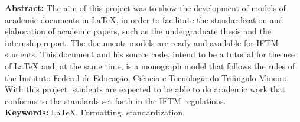 \begin{singlespace}
\textbf{Abstract: }
The aim of this project was to show the development of models of academic documents in LaTeX, in order to facilitate the standardization and elaboration of academic papers, such as the undergraduate thesis and the internship report. The documents models are ready and available for IFTM students. This document and his source code, intend to be a tutorial for the use of LaTeX and, at the same time, is a monograph model that follows the rules of the Instituto Federal de Educação, Ciência e Tecnologia do Triângulo Mineiro. With this project, students are expected to be able to do academic work that conforms to the standards set forth in the IFTM regulations.\\
\textbf{Keywords: }
LaTeX. Formatting. standardization.
\end{singlespace}